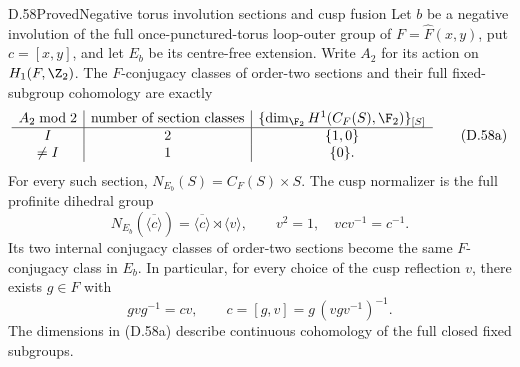 \begin{claim}{D.58}{Proved}{Negative torus involution sections and cusp fusion}
Let $b$ be a negative involution of the full
once-punctured-torus loop-outer group of
$F=\widehat F(x,y)$, put $c=[x,y]$, and let
$E_b$ be its centre-free extension.
Write $A_2$ for its action on $H_1(F,\Z_2)$.
The $F$-conjugacy classes of order-two sections and
their full fixed-subgroup cohomology are exactly
\[
\begin{array}{c|c|c}
 A_2\bmod2&
 \text{number of section classes}&
 \{\dim_{\F_2}H^1(C_F(S),\F_2)\}_{[S]}\\ \hline
 I&2&\{1,0\}\\
 \ne I&1&\{0\}.
\end{array}                                             \tag{D.58a}
\]
For every such section,
$N_{E_b}(S)=C_F(S)\times S$.
The cusp normalizer is the full profinite dihedral
group
\[
 N_{E_b}(\overline{\langle c\rangle})
       =\overline{\langle c\rangle}
                       \rtimes\langle v\rangle,\qquad
 v^2=1,\quad vcv^{-1}=c^{-1}.                            \tag{D.58b}
\]
Its two internal conjugacy classes of order-two
sections become the same $F$-conjugacy class in $E_b$.
In particular, for every choice of the cusp reflection
$v$, there exists $g\in F$ with
\[
                  gvg^{-1}=cv,\qquad
                  c=[g,v]=g\,(vgv^{-1})^{-1}.            \tag{D.58c}
\]
The dimensions in (D.58a) describe continuous cohomology
of the full closed fixed subgroups.
\end{claim}
